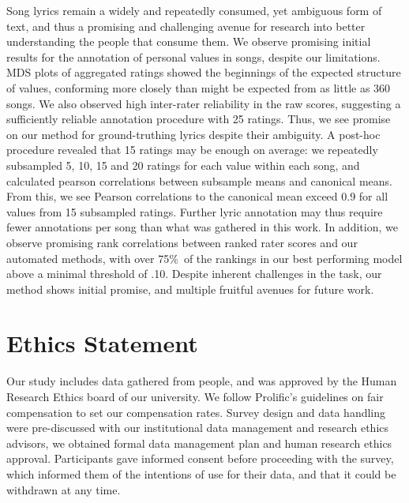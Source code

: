 \documentclass{article}
\begin{document}
Song lyrics remain a widely and repeatedly consumed, yet ambiguous form of text, and thus a promising and challenging avenue for research into better understanding the people that consume them. We observe promising initial results for the annotation of personal values in songs, despite our limitations. MDS plots of aggregated ratings showed the beginnings of the expected structure of values, conforming more closely than might be expected from as little as 360 songs. We also observed high inter-rater reliability in the raw scores, suggesting a sufficiently reliable annotation procedure with 25 ratings. Thus, we see promise on our method for ground-truthing lyrics despite their ambiguity. A post-hoc procedure revealed that 15 ratings may be enough on average: we repeatedly subsampled 5, 10, 15 and 20 ratings for each value within each song, and calculated pearson correlations between subsample means and canonical means. From this, we see Pearson correlations to the canonical mean exceed 0.9 for all values from 15 subsampled ratings. Further lyric annotation may thus require fewer annotations per song than what was gathered in this work. In addition, we observe promising rank correlations between ranked rater scores and our automated methods, with over 75\%\ of the rankings in our best performing model above a minimal threshold of .10. Despite inherent challenges in the task, our method shows initial promise, and multiple fruitful avenues for future work. 

\section{Ethics Statement}

Our study includes data gathered from people, and was approved by the Human Research Ethics board of our university. We follow Prolific's guidelines on fair compensation to set our compensation rates. Survey design and data handling were pre-discussed with our institutional data management and research ethics advisors, we obtained formal data management plan and human research ethics approval. Participants gave informed consent before proceeding with the survey, which informed them of the intentions of use for their data, and that it could be withdrawn at any time. 



%
%
%
%
%
\end{document}
